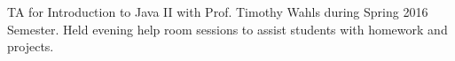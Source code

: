 \documentclass[]{deedy-resume-openfont}
\begin{document}
\begin{minipage}[t]{0.66\textwidth}
TA for Introduction to Java II with Prof. Timothy Wahls during Spring 2016 Semester. Held evening help room sessions to assist students with homework and projects.
\sectionsep







% 
% 

\end{minipage}
\end{document}
